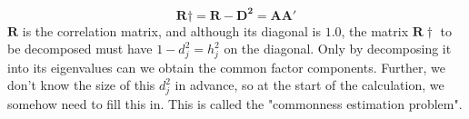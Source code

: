 \documentclass{ltjsbook}
\begin{document}
\[
	\bm{R}\dagger = \bm{R}-\bm{D^2} = \bm{AA'}
\]
$\bm{R}$ is the correlation matrix, and although its diagonal is $1.0$, the matrix $\bm{R}\dagger$ to be decomposed must have $1-d_j^2=h_j^2$ on the diagonal. Only by decomposing it into its eigenvalues can we obtain the common factor components. Further, we don't know the size of this $d_j^2$ in advance, so at the start of the calculation, we somehow need to fill this in. This is called the "commonness estimation problem".
\end{document}
